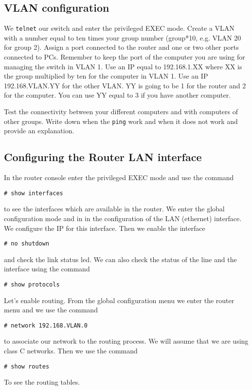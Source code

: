 \subsection{VLAN configuration}
We \texttt{telnet} our switch and enter the privileged EXEC mode.
Create a VLAN with a number equal to ten times your group number (group*10, e.g. VLAN 20 for group 2).
Assign a port connected to the router and one or two other ports connected to PCs.
Remember to keep the port of the computer you are using for managing the switch in VLAN 1.
Use an IP equal to 192.168.1.XX where XX is the group multiplied by ten for the computer in VLAN 1.
Use an IP 192.168.VLAN.YY for the other VLAN.
YY is going to be 1 for the router and 2 for the computer.
You can use YY equal to 3 if you have another computer.

Test the connectivity between your different computers and with computers of other groups.
Write down when the \texttt{ping} work and when it does not work and provide an explanation.

\subsection{Configuring the Router LAN interface}

In the router console enter the privileged EXEC mode and use the command
\begin{lstlisting}
# show interfaces
\end{lstlisting}
to see the interfaces which are available in the router.
We enter the global configuration mode and in in the configuration of the LAN (ethernet) interface.
We configure the IP for this interface.
Then we enable the interface
\begin{lstlisting}
# no shutdown
\end{lstlisting}
and check the link status led.
We can also check the status of the line and the interface using the command
\begin{lstlisting}
# show protocols
\end{lstlisting}

Let's enable routing.
From the global configuration menu we enter the router menu and we use the command
\begin{lstlisting}
# network 192.168.VLAN.0
\end{lstlisting}
to associate our network to the routing process.
We will assume that we are using class C networks.
Then we use the command
\begin{lstlisting}
# show routes
\end{lstlisting}
To see the routing tables.

